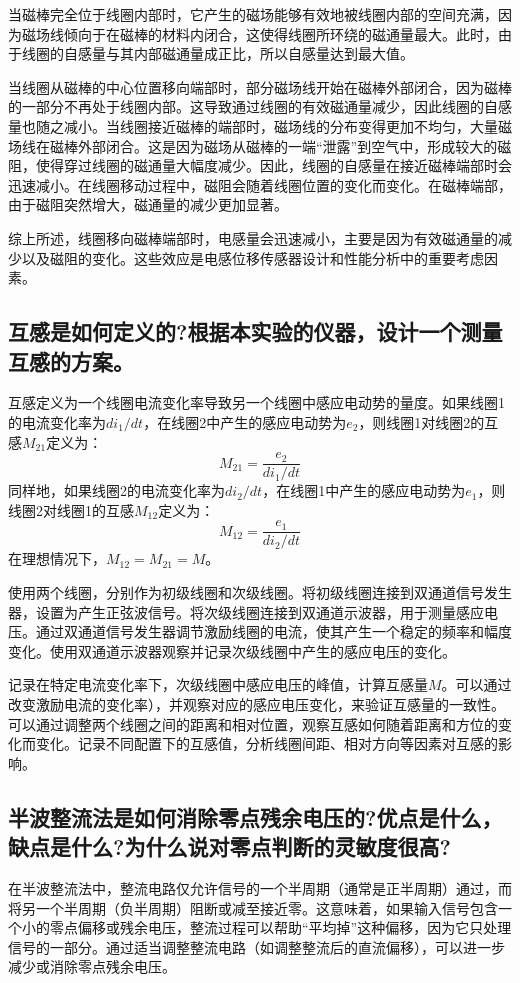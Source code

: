 \documentclass{article}
\begin{document}
当磁棒完全位于线圈内部时，它产生的磁场能够有效地被线圈内部的空间充满，因为磁场线倾向于在磁棒的材料内闭合，这使得线圈所环绕的磁通量最大。此时，由于线圈的自感量与其内部磁通量成正比，所以自感量达到最大值。

当线圈从磁棒的中心位置移向端部时，部分磁场线开始在磁棒外部闭合，因为磁棒的一部分不再处于线圈内部。这导致通过线圈的有效磁通量减少，因此线圈的自感量也随之减小。当线圈接近磁棒的端部时，磁场线的分布变得更加不均匀，大量磁场线在磁棒外部闭合。这是因为磁场从磁棒的一端“泄露”到空气中，形成较大的磁阻，使得穿过线圈的磁通量大幅度减少。因此，线圈的自感量在接近磁棒端部时会迅速减小。在线圈移动过程中，磁阻会随着线圈位置的变化而变化。在磁棒端部，由于磁阻突然增大，磁通量的减少更加显著。

综上所述，线圈移向磁棒端部时，电感量会迅速减小，主要是因为有效磁通量的减少以及磁阻的变化。这些效应是电感位移传感器设计和性能分析中的重要考虑因素。

\subsection{互感是如何定义的?根据本实验的仪器，设计一个测量互感的方案。}
互感定义为一个线圈电流变化率导致另一个线圈中感应电动势的量度。如果线圈1的电流变化率为\(di_1/dt\)，在线圈2中产生的感应电动势为\(e_2\)，则线圈1对线圈2的互感\(M_{21}\)定义为：
\[ M_{21} = \frac{e_2}{di_1/dt} \]
同样地，如果线圈2的电流变化率为\(di_2/dt\)，在线圈1中产生的感应电动势为\(e_1\)，则线圈2对线圈1的互感\(M_{12}\)定义为：
\[ M_{12} = \frac{e_1}{di_2/dt} \]
在理想情况下，\(M_{12} = M_{21} = M\)。

使用两个线圈，分别作为初级线圈和次级线圈。将初级线圈连接到双通道信号发生器，设置为产生正弦波信号。将次级线圈连接到双通道示波器，用于测量感应电压。通过双通道信号发生器调节激励线圈的电流，使其产生一个稳定的频率和幅度变化。使用双通道示波器观察并记录次级线圈中产生的感应电压的变化。

记录在特定电流变化率下，次级线圈中感应电压的峰值，计算互感量\(M\)。可以通过改变激励电流的变化率），并观察对应的感应电压变化，来验证互感量的一致性。可以通过调整两个线圈之间的距离和相对位置，观察互感如何随着距离和方位的变化而变化。记录不同配置下的互感值，分析线圈间距、相对方向等因素对互感的影响。

\subsection{半波整流法是如何消除零点残余电压的?优点是什么，缺点是什么?为什么说对零点判断的灵敏度很高?}
在半波整流法中，整流电路仅允许信号的一个半周期（通常是正半周期）通过，而将另一个半周期（负半周期）阻断或减至接近零。这意味着，如果输入信号包含一个小的零点偏移或残余电压，整流过程可以帮助“平均掉”这种偏移，因为它只处理信号的一部分。通过适当调整整流电路（如调整整流后的直流偏移），可以进一步减少或消除零点残余电压。
\end{document}
